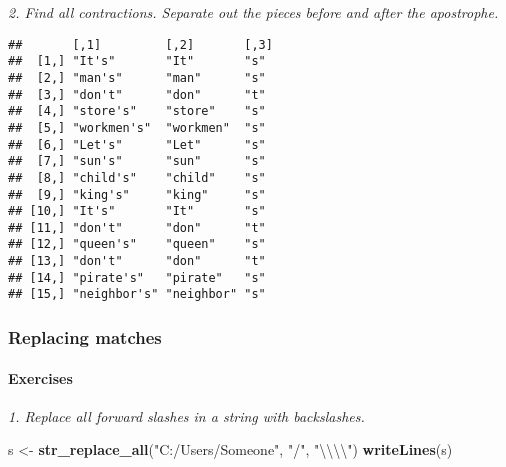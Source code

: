 \documentclass[]{article}
\newenvironment{Shaded}{\begin{snugshade}}{\end{snugshade}}
\newcommand{\KeywordTok}[1]{\textcolor[rgb]{0.13,0.29,0.53}{\textbf{#1}}}
\newcommand{\CharTok}[1]{\textcolor[rgb]{0.31,0.60,0.02}{#1}}
\newcommand{\StringTok}[1]{\textcolor[rgb]{0.31,0.60,0.02}{#1}}
\newcommand{\OperatorTok}[1]{\textcolor[rgb]{0.81,0.36,0.00}{\textbf{#1}}}
\newcommand{\NormalTok}[1]{#1}
\let\oldparagraph\paragraph
\renewcommand{\paragraph}[1]{\oldparagraph{#1}\mbox{}}
\theoremstyle{definition}
\theoremstyle{definition}
\theoremstyle{definition}
\theoremstyle{remark}
\begin{document}
\emph{2. Find all contractions. Separate out the pieces before and after
the apostrophe.}

\begin{Shaded}
\end{Shaded}

\begin{verbatim}
##       [,1]         [,2]       [,3]
##  [1,] "It's"       "It"       "s" 
##  [2,] "man's"      "man"      "s" 
##  [3,] "don't"      "don"      "t" 
##  [4,] "store's"    "store"    "s" 
##  [5,] "workmen's"  "workmen"  "s" 
##  [6,] "Let's"      "Let"      "s" 
##  [7,] "sun's"      "sun"      "s" 
##  [8,] "child's"    "child"    "s" 
##  [9,] "king's"     "king"     "s" 
## [10,] "It's"       "It"       "s" 
## [11,] "don't"      "don"      "t" 
## [12,] "queen's"    "queen"    "s" 
## [13,] "don't"      "don"      "t" 
## [14,] "pirate's"   "pirate"   "s" 
## [15,] "neighbor's" "neighbor" "s"
\end{verbatim}

\subsubsection{Replacing matches}\label{replacing-matches}

\paragraph{Exercises}\label{exercises-34}

\emph{1. Replace all forward slashes in a string with backslashes.}

\begin{Shaded}
\begin{Highlighting}[]
\NormalTok{s <-}\StringTok{ }\KeywordTok{str_replace_all}\NormalTok{(}\StringTok{"C:/Users/Someone"}\NormalTok{, }\StringTok{"/"}\NormalTok{, }\StringTok{"}\CharTok{\textbackslash{}\textbackslash{}\textbackslash{}\textbackslash{}}\StringTok{"}\NormalTok{)}
\KeywordTok{writeLines}\NormalTok{(s)}
\end{Highlighting}
\end{Shaded}
\end{document}
